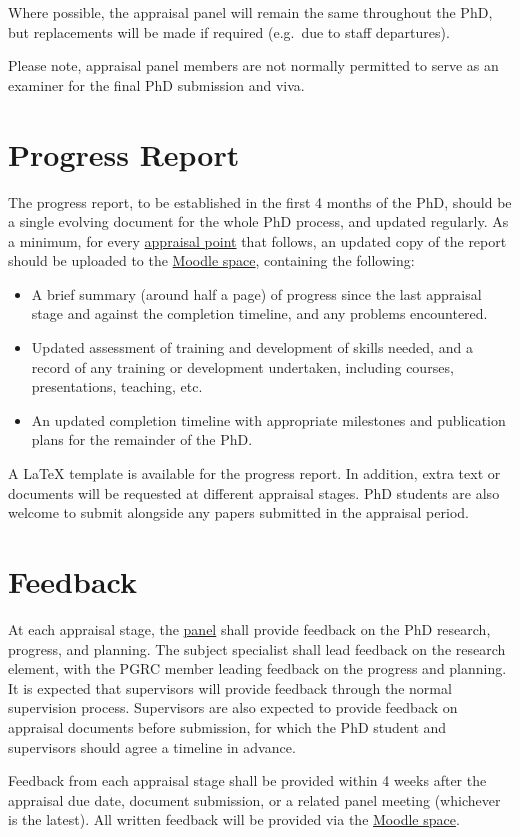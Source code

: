 Where possible, the appraisal panel will remain the same throughout the PhD, but replacements will be made if required (e.g.\ due to staff departures).

Please note, appraisal panel members are not normally permitted to serve as an examiner for the final PhD submission and viva.

\section{Progress Report} \label{sec:report}
The progress report, to be established in the first 4 months of the PhD, should be a single evolving document for the whole PhD process, and updated regularly. As a minimum, for every \hyperref[sec:points]{appraisal point} that follows, an updated copy of the report should be uploaded to the \href{https://modules.lancaster.ac.uk/course/view.php?id=7050}{Moodle space}, containing the following:
\begin{itemize}
	\item A brief summary (around half a page) of progress since the last appraisal stage and against the completion timeline, and any problems encountered.
	\item Updated assessment of training and development of skills needed, and a record of any training or development undertaken, including courses, presentations, teaching, etc.\
	\item An updated completion timeline with appropriate milestones and publication plans for the remainder of the PhD.
\end{itemize}

A \LaTeX{} template is available for the progress report. In addition, extra text or documents will be requested at different appraisal stages. PhD students are also welcome to submit alongside any papers submitted in the appraisal period.


\section{Feedback} \label{sec:feedback}
At each appraisal stage, the \hyperref[sec:panel]{panel} shall provide feedback on the PhD research, progress, and planning. The subject specialist shall lead feedback on the research element, with the PGRC member leading feedback on the progress and planning. It is expected that supervisors will provide feedback through the normal supervision process. Supervisors are also expected to provide feedback on appraisal documents before submission, for which the PhD student and supervisors should agree a timeline in advance.

Feedback from each appraisal stage shall be provided within 4 weeks after the appraisal due date, document submission, or a related panel meeting (whichever is the latest). All written feedback will be provided via the \href{https://modules.lancaster.ac.uk/course/view.php?id=7050}{Moodle space}.